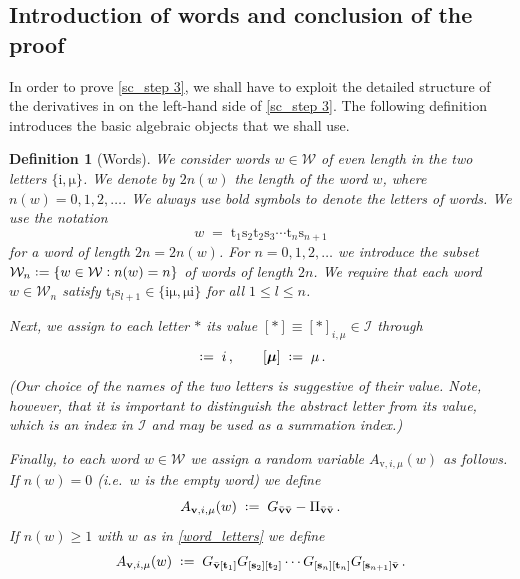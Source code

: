 \documentclass[11pt]{article} %
\numberwithin{equation}{section}
\numberwithin{figure}{section}
\theoremstyle{plain} %
\newtheorem{definition}[theorem]{Definition}
\theoremstyle{definition} %
\newcommand{\f}[1]{\boldsymbol{\mathrm{#1}}} %
\renewcommand{\cal}{\mathcal}
\newcommand{\col}{\mathrel{\vcenter{\baselineskip0.75ex \lineskiplimit0pt \hbox{.}\hbox{.}}}}
\newcommand*{\deq}{\mathrel{\vcenter{\baselineskip0.65ex \lineskiplimit0pt \hbox{.}\hbox{.}}}=}
\renewcommand{\leq}{\leqslant}
\renewcommand{\geq}{\geqslant}
\begin{document}
\subsection{Introduction of words and conclusion of the proof} \label{sec:words}
In order to prove \eqref{sc_step 3}, we shall have to exploit the detailed structure of the derivatives in on the left-hand side of \eqref{sc_step 3}. The following definition introduces the basic algebraic objects that we shall use.

\begin{definition}[Words] \label{def:words}
We consider words $w \in \cal W$ of even length in the two letters $\{\f i, \f \mu\}$. We denote by $2 n(w)$ the length of the word $w$, where $n(w) = 0,1,2, \dots$. We always use bold symbols to denote the letters of words. We use the notation
\begin{equation} \label{word_letters}
w \;=\; \f t_1 \f s_2 \f t_2 \f s_3 \cdots \f t_n \f s_{n+1}
\end{equation}
for a word of length $2n = 2n(w)$. For $n = 0,1,2, \dots$ we introduce the subset $\cal W_n \deq \{w \in \cal W \col n(w) = n\}$ of words of length $2n$. We require that each word $w \in \cal W_n$ satisfy $\f t_l \f s_{l+1} \in \{\f i \f \mu, \f \mu \f i\}$ for all $1 \leq l \leq n$.

Next, we assign to each letter $*$ its value $[*] \equiv [*]_{i,\mu} \in \cal I$ through
\begin{equation*}
[\f i] \;\deq\; i\,, \qquad [\f \mu] \;\deq\; \mu\,.
\end{equation*}
(Our choice of the names of the two letters is suggestive of their value. Note, however, that it is important to distinguish the abstract letter from its value, which is an index in $\cal I$ and may be used as a summation index.)

Finally, to each word $w \in \cal W$ we assign a random variable $A_{\f v, i,\mu}(w)$ as follows. If $n(w) = 0$ (i.e.\ $w$ is the empty word) we define
\begin{equation*}
A_{\f v,i,\mu}(w) \;\deq\; G_{\bar {\f v} \bar {\f v}} - \Pi_{\bar {\f v} \bar {\f v}}\,.
\end{equation*}
If $n(w) \geq 1$ with $w$ as in \eqref{word_letters} we define
\begin{equation} \label{def_w_1}
A_{\f v,i,\mu}(w) \;\deq\; G_{\bar{\f v} [\f t_1]} G_{[\f s_2] [\f t_2]} \cdots G_{[\f s_n] [\f t_n]} G_{[\f s_{n+1}] \bar {\f v}}\,.
\end{equation}
\end{definition}
\end{document}
